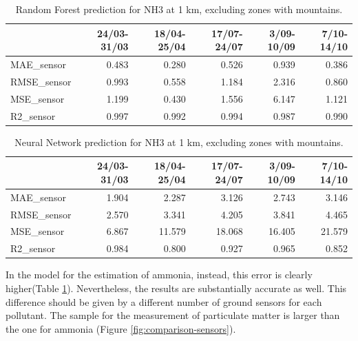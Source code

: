 \begin{table}[H]
\begin{tabular}{lrrrrr}
\toprule
  &  24/03-31/03 &  18/04-25/04 &  17/07-24/07 &  3/09-10/09 &  7/10-14/10 \\
\midrule
 MAE\_sensor &        0.483 &        0.280 &        0.526 &       0.939 &       0.386 \\
RMSE\_sensor &        0.993 &        0.558 &        1.184 &       2.316 &       0.860 \\
 MSE\_sensor &        1.199 &        0.430 &        1.556 &       6.147 &       1.121 \\
  R2\_sensor &        0.997 &        0.992 &        0.994 &       0.987 &       0.990 \\
\bottomrule
\end{tabular}
\caption{Random Forest prediction for NH3 at 1 km, excluding zones with mountains.}
\label{tab:nh3RF}
\end{table}
\begin{table}[H]
\begin{tabular}{lrrrrr}
\toprule
  &  24/03-31/03 &  18/04-25/04 &  17/07-24/07 &  3/09-10/09 &  7/10-14/10 \\
\midrule
 MAE\_sensor &        1.904 &        2.287 &        3.126 &       2.743 &       3.146 \\
RMSE\_sensor &        2.570 &        3.341 &        4.205 &       3.841 &       4.465 \\
 MSE\_sensor &        6.867 &       11.579 &       18.068 &      16.405 &      21.579 \\
  R2\_sensor &        0.984 &        0.800 &        0.927 &       0.965 &       0.852 \\
\bottomrule
\end{tabular}
\caption{Neural Network prediction for NH3 at 1 km, excluding zones with mountains.}
\label{tab:nh3NN}
\end{table}
In the model for the estimation of ammonia, instead, this error is clearly higher(Table \ref{tab:nh3RF}).
Nevertheless, the results are substantially accurate as well. 
This difference should be given by a different number of ground sensors for each pollutant. The sample for the measurement of particulate matter is larger than the one for ammonia (Figure \ref{fig:comparison-sensors}).
